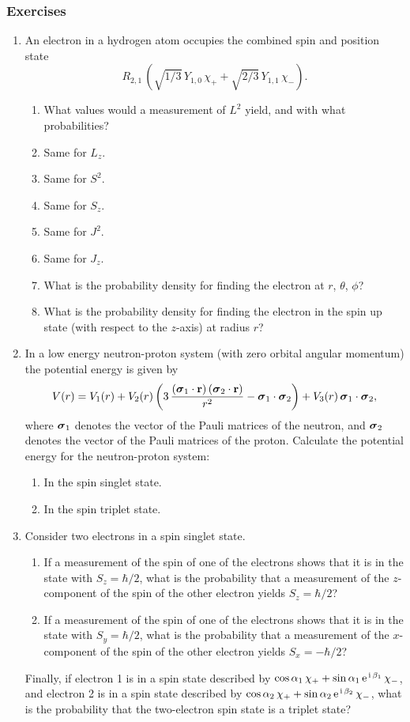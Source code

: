 \subsubsection*{Exercises}
{\small
\begin{enumerate}
\item An electron in a hydrogen atom occupies the combined spin
and position state
$$
R_{2,1}\,\left(\sqrt{1/3}\,Y_{1,0}\,\chi_+ + \sqrt{2/3}\,Y_{1,1}\,\chi_-\right).
$$
\begin{enumerate}
\item What values would a measurement of $L^2$ yield, and with
what probabilities?
\item Same for $L_z$.
\item Same for $S^2$.
\item Same for $S_z$.
\item Same for $J^2$.
\item Same for $J_z$.
\item What is the probability density for finding the electron at
$r$, $\theta$, $\phi$?
\item What is the probability density for finding the electron in the
spin up state (with respect to the $z$-axis) at radius $r$?
\end{enumerate}


\item In a low energy neutron-proton system (with zero orbital angular
momentum) the potential energy is given by
$$
V(r) = V_1(r) + V_2(r)\left(3\,\frac{(\mbox{\boldmath$\sigma$}_1\cdot{\bf r})\,(\mbox{\boldmath$\sigma$}_2\cdot
{\bf r})}{r^2} -\mbox{\boldmath$\sigma$}_1\cdot\mbox{\boldmath$\sigma$}_2\right) + V_3(r)\,\mbox{\boldmath$\sigma$}_1\cdot\mbox{\boldmath$\sigma$}_2,
$$
where $\mbox{\boldmath$\sigma$}_1$ denotes the vector of the Pauli matrices of the neutron,
and $\mbox{\boldmath$\sigma$}_2$ denotes the vector of the Pauli matrices of the proton. Calculate
the potential energy for the neutron-proton system:
\begin{enumerate}
\item In the spin singlet state.
\item In the spin triplet state.
\end{enumerate}


\item Consider two electrons in a spin singlet state.
\begin{enumerate}
\item If a measurement of the spin of one of the electrons shows that it
is in the state with $S_z=\hbar/2$, what is the probability that a
measurement of the $z$-component of the spin of the
other electron yields $S_z=\hbar/2$?
\item If a measurement of the spin of one of the electrons shows
that it is in the state with $S_y=\hbar/2$, what is the probability that a
measurement of the $x$-component of the spin of the
other electron yields $S_x=-\hbar/2$?
\end{enumerate}
Finally, if electron 1 is in a spin state described by $\cos\alpha_1\,\chi_+
+ \sin\alpha_1\,{\rm e}^{\,{\rm i}\,\beta_1}\,\chi_-$, and
electron 2 is in a spin state described by  $\cos\alpha_2\,\chi_+
+ \sin\alpha_2\,{\rm e}^{\,{\rm i}\,\beta_2}\,\chi_-$, what is
the probability that the two-electron spin state is a triplet state?
\end{enumerate}

}